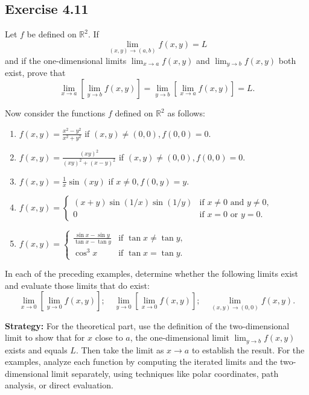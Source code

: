 \begin{problembox}
    \subsection*{Exercise 4.11}
    Let $f$ be defined on $\mathbb{R}^2$. If
    \[
    \lim_{(x, y) \to (a, b)} f(x, y) = L
    \]
    and if the one-dimensional limits $\lim_{x \to a} f(x, y)$ and $\lim_{y \to b} f(x, y)$ both exist, prove that
    \[
    \lim_{x \to a} \left[ \lim_{y \to b} f(x, y) \right] = \lim_{y \to b} \left[ \lim_{x \to a} f(x, y) \right] = L.
    \]
    
    Now consider the functions $f$ defined on $\mathbb{R}^2$ as follows:
    \begin{enumerate}[label=\alph*)]
        \item $f(x, y) = \frac{x^2 - y^2}{x^2 + y^2}$ if $(x, y) \neq (0, 0), f(0, 0) = 0.$
        \item $f(x, y) = \frac{(xy)^2}{(xy)^2 + (x - y)^2}$ if $(x, y) \neq (0, 0), f(0, 0) = 0.$
        \item $f(x, y) = \frac{1}{x} \sin (xy)$ if $x \neq 0, f(0, y) = y.$
        \item $f(x, y) = 
            \begin{cases}
                (x + y) \sin (1/x) \sin (1/y) & \text{if } x \neq 0 \text{ and } y \neq 0,\\
                0 & \text{if } x = 0 \text{ or } y = 0.
            \end{cases}$
        \item $f(x, y) = 
            \begin{cases}
                \frac{\sin x - \sin y}{\tan x - \tan y} & \text{if } \tan x \neq \tan y,\\
                \cos^3 x & \text{if } \tan x = \tan y.
            \end{cases}$
    \end{enumerate}
    
    In each of the preceding examples, determine whether the following limits exist and evaluate those limits that do exist:
    \[
    \lim_{x \to 0} \left[ \lim_{y \to 0} f(x, y) \right]; \quad \lim_{y \to 0} \left[ \lim_{x \to 0} f(x, y) \right]; \quad \lim_{(x, y) \to (0, 0)} f(x, y).
    \]
\end{problembox}

\noindent\textbf{Strategy:} For the theoretical part, use the definition of the two-dimensional limit to show that for $x$ close to $a$, the one-dimensional limit $\lim_{y \to b} f(x, y)$ exists and equals $L$. Then take the limit as $x \to a$ to establish the result. For the examples, analyze each function by computing the iterated limits and the two-dimensional limit separately, using techniques like polar coordinates, path analysis, or direct evaluation.

